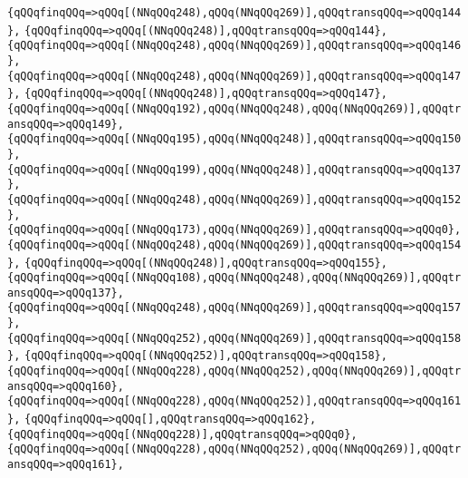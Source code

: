 \verb|{qQQqfinqQQq=>qQQq[(NNqQQq248),qQQq(NNqQQq269)],qQQqtransqQQq=>qQQq144},|\newline
\verb|{qQQqfinqQQq=>qQQq[(NNqQQq248)],qQQqtransqQQq=>qQQq144},|\newline
\verb|{qQQqfinqQQq=>qQQq[(NNqQQq248),qQQq(NNqQQq269)],qQQqtransqQQq=>qQQq146},|\newline
\verb|{qQQqfinqQQq=>qQQq[(NNqQQq248),qQQq(NNqQQq269)],qQQqtransqQQq=>qQQq147},|\newline
\verb|{qQQqfinqQQq=>qQQq[(NNqQQq248)],qQQqtransqQQq=>qQQq147},|\newline
\verb|{qQQqfinqQQq=>qQQq[(NNqQQq192),qQQq(NNqQQq248),qQQq(NNqQQq269)],qQQqtransqQQq=>qQQq149},|\newline
\verb|{qQQqfinqQQq=>qQQq[(NNqQQq195),qQQq(NNqQQq248)],qQQqtransqQQq=>qQQq150},|\newline
\verb|{qQQqfinqQQq=>qQQq[(NNqQQq199),qQQq(NNqQQq248)],qQQqtransqQQq=>qQQq137},|\newline
\verb|{qQQqfinqQQq=>qQQq[(NNqQQq248),qQQq(NNqQQq269)],qQQqtransqQQq=>qQQq152},|\newline
\verb|{qQQqfinqQQq=>qQQq[(NNqQQq173),qQQq(NNqQQq269)],qQQqtransqQQq=>qQQq0},|\newline
\verb|{qQQqfinqQQq=>qQQq[(NNqQQq248),qQQq(NNqQQq269)],qQQqtransqQQq=>qQQq154},|\newline
\verb|{qQQqfinqQQq=>qQQq[(NNqQQq248)],qQQqtransqQQq=>qQQq155},|\newline
\verb|{qQQqfinqQQq=>qQQq[(NNqQQq108),qQQq(NNqQQq248),qQQq(NNqQQq269)],qQQqtransqQQq=>qQQq137},|\newline
\verb|{qQQqfinqQQq=>qQQq[(NNqQQq248),qQQq(NNqQQq269)],qQQqtransqQQq=>qQQq157},|\newline
\verb|{qQQqfinqQQq=>qQQq[(NNqQQq252),qQQq(NNqQQq269)],qQQqtransqQQq=>qQQq158},|\newline
\verb|{qQQqfinqQQq=>qQQq[(NNqQQq252)],qQQqtransqQQq=>qQQq158},|\newline
\verb|{qQQqfinqQQq=>qQQq[(NNqQQq228),qQQq(NNqQQq252),qQQq(NNqQQq269)],qQQqtransqQQq=>qQQq160},|\newline
\verb|{qQQqfinqQQq=>qQQq[(NNqQQq228),qQQq(NNqQQq252)],qQQqtransqQQq=>qQQq161},|\newline
\verb|{qQQqfinqQQq=>qQQq[],qQQqtransqQQq=>qQQq162},|\newline
\verb|{qQQqfinqQQq=>qQQq[(NNqQQq228)],qQQqtransqQQq=>qQQq0},|\newline
\verb|{qQQqfinqQQq=>qQQq[(NNqQQq228),qQQq(NNqQQq252),qQQq(NNqQQq269)],qQQqtransqQQq=>qQQq161},|\newline
